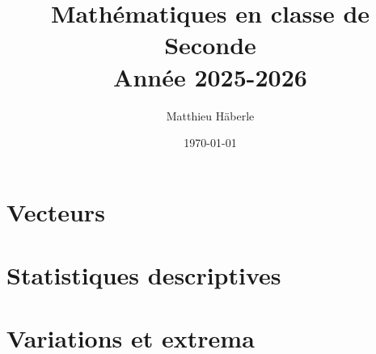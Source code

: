 \documentclass[a4paper, 12pt]{report}
\title{\Huge{Mathématiques en classe de Seconde}\\ Année 2025-2026}
\author{\huge{Matthieu Häberle}}
\date{\today}
\begin{document}
\maketitle
\newpage%
\tableofcontents
\pagebreak





















\chapter{Vecteurs}



\chapter{Statistiques descriptives}



\chapter{Variations et extrema}


\end{document}
